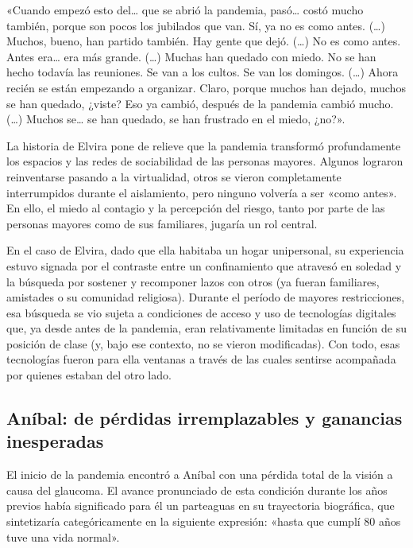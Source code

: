 \begin{refsection}
\begin{gbcita}
«Cuando empezó esto del… que se abrió la pandemia, pasó… costó mucho también, porque son pocos los jubilados que van. Sí, ya no es como antes. (…) Muchos, bueno, han partido también. Hay gente que dejó. (…) No es como antes. Antes era… era más grande. (…) Muchas han quedado con miedo. No se han hecho todavía las reuniones. Se van a los cultos. Se van los domingos. (…) Ahora recién se están empezando a organizar. Claro, porque muchos han dejado, muchos se han quedado, ¿viste? Eso ya cambió, después de la pandemia cambió mucho. (…) Muchos se… se han quedado, se han frustrado en el miedo, ¿no?».

\end{gbcita}

La historia de Elvira pone de relieve que la pandemia transformó profundamente los espacios y las redes de sociabilidad de las personas mayores. Algunos lograron reinventarse pasando a la virtualidad, otros se vieron completamente interrumpidos durante el aislamiento, pero ninguno volvería a ser «como antes». En ello, el miedo al contagio y la percepción del riesgo, tanto por parte de las personas mayores como de sus familiares, jugaría un rol central.

En el caso de Elvira, dado que ella habitaba un hogar unipersonal, su experiencia estuvo signada por el contraste entre un confinamiento que atravesó en soledad y la búsqueda por sostener y recomponer lazos con otros (ya fueran familiares, amistades o su comunidad religiosa). Durante el período de mayores restricciones, esa búsqueda se vio sujeta a condiciones de acceso y uso de tecnologías digitales que, ya desde antes de la pandemia, eran relativamente limitadas en función de su posición de clase (y, bajo ese contexto, no se vieron modificadas). Con todo, esas tecnologías fueron para ella ventanas a través de las cuales sentirse acompañada por quienes estaban del otro lado.


\subsection[Aníbal: de pérdidas irremplazables y ganancias inesperadas]{Aníbal: de pérdidas irremplazables y ganancias inesperadas}
\label{cap-30.anibal-de-perdidas-irremplazables-y-ganancias-inesperadas}
El inicio de la pandemia encontró a Aníbal con una pérdida total de la visión a causa del glaucoma. El avance pronunciado de esta condición durante los años previos había significado para él un parteaguas en su trayectoria biográfica, que sintetizaría categóricamente en la siguiente expresión: «hasta que cumplí 80 años tuve una vida normal».


\end{refsection}
